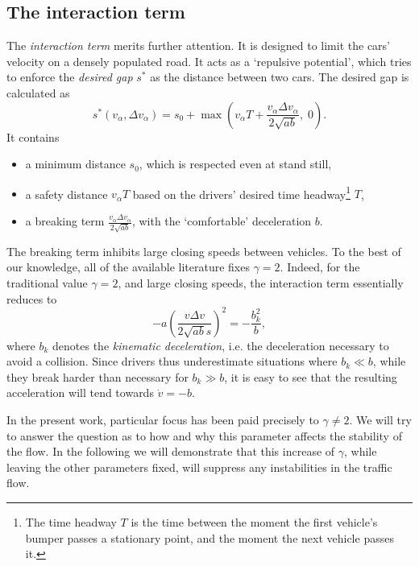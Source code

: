 \subsection{The interaction term}
\label{sec:interaction}
The \emph{interaction term} merits further attention. It is designed to limit the cars' velocity on a densely populated road. It acts as a `repulsive potential', which tries to enforce the \emph{desired gap} $s^*$ as the distance between two cars. The desired gap is calculated as
\begin{equation}
s^*(v_\alpha, \Delta v_\alpha) = s_0 + \max\left(v_\alpha T + \frac{v_\alpha \Delta v_\alpha}{2\sqrt{ab}},\;0\right).
\label{eq:desired_gap}
\end{equation}
It contains
\begin{itemize}
    \item a minimum distance $s_0$, which is respected even at stand still,
    \item a safety distance $v_\alpha T$ based on the drivers' desired time headway\footnote{The time headway $T$ is the time between the moment the first vehicle's bumper passes a stationary point, and the moment the next vehicle passes it.} $T$,
    \item a breaking term $\frac{v_\alpha \Delta v_\alpha}{2\sqrt{ab}}$, with the `comfortable' deceleration $b$.
\end{itemize}
The breaking term inhibits large closing speeds between vehicles. To the best of our knowledge, all of the available literature fixes $\gamma=2$. Indeed, for the traditional value $\gamma=2$, and large closing speeds, the interaction term essentially reduces to 
\begin{equation}
    -a \left(\frac{v \Delta v}{2 \sqrt{a b}s}\right)^2 = -\frac{b_k^2}{b},
    \label{eq:decel}
\end{equation}
where $b_k$ denotes the \emph{kinematic deceleration}, i.e. the deceleration necessary to avoid a collision. Since drivers thus underestimate situations where $b_k\ll b$, while they break harder than necessary for $b_k\gg b$, it is easy to see that the resulting acceleration will tend towards $\dot v = -b$. \cite{treiber2000}

In the present work, particular focus has been paid precisely to  $\gamma \ne 2$. We will try to answer the question as to how and why this parameter affects the stability of the flow. In the following we will demonstrate that this increase of $\gamma$, while leaving the other parameters fixed, will suppress any instabilities in the traffic flow.

